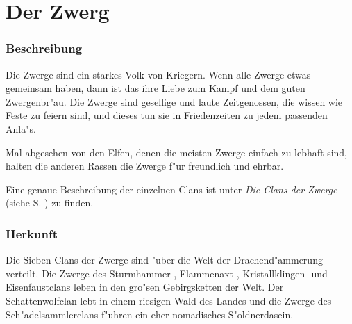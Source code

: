 \section{Der Zwerg} \label{zwerge}
\subsubsection{Beschreibung}
\par Die Zwerge sind ein starkes Volk von Kriegern. Wenn alle Zwerge etwas gemeinsam haben, dann ist das ihre Liebe zum Kampf und dem guten Zwergenbr"au. Die Zwerge sind gesellige und laute Zeitgenossen, die wissen wie Feste zu feiern sind, und dieses tun sie in Friedenzeiten zu jedem passenden Anla"s.
\par Mal abgesehen von den Elfen, denen die meisten Zwerge einfach zu \glqq lebhaft\grqq{} sind, halten die anderen Rassen die Zwerge f"ur freundlich und ehrbar.
\par Eine genaue Beschreibung der einzelnen Clans ist unter \textit{Die Clans der Zwerge} (siehe S. \pageref{diezwerge}) zu finden.
\subsubsection{Herkunft}
\par Die Sieben Clans der Zwerge sind "uber die Welt der Drachend"ammerung verteilt. Die Zwerge des Sturmhammer-, Flammenaxt-, Kristallklingen- und Eisenfaustclans leben in den gro"sen Gebirgsketten der Welt. Der Schattenwolfclan lebt in einem riesigen Wald des Landes und die Zwerge des Sch"adelsammlerclans f"uhren ein eher nomadisches S"oldnerdasein.
